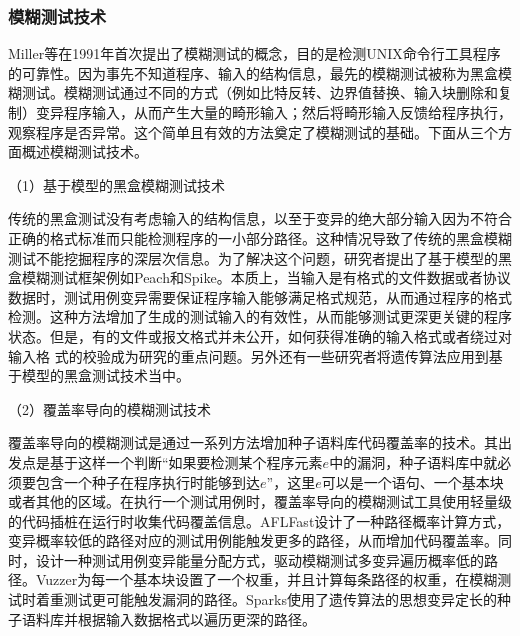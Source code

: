 \subsubsection{模糊测试技术}

Miller等在1991年首次提出了模糊测试的概念，目的是检测UNIX命令行工具程序的可靠性。因为事先不知道程序、输入的结构信息，最先的模糊测试被称为黑盒模糊测试。模糊测试通过不同的方式（例如比特反转、边界值替换、输入块删除和复制）变异程序输入，从而产生大量的畸形输入；然后将畸形输入反馈给程序执行，观察程序是否异常。这个简单且有效的方法奠定了模糊测试的基础。下面从三个方面概述模糊测试技术。

（1）基于模型的黑盒模糊测试技术

传统的黑盒测试没有考虑输入的结构信息，以至于变异的绝大部分输入因为不符合正确的格式标准而只能检测程序的一小部分路径。这种情况导致了传统的黑盒模糊测试不能挖掘程序的深层次信息。为了解决这个问题，研究者提出了基于模型的黑盒模糊测试框架例如Peach和Spike。本质上，当输入是有格式的文件数据或者协议数据时，测试用例变异需要保证程序输入能够满足格式规范，从而通过程序的格式检测。这种方法增加了生成的测试输入的有效性，从而能够测试更深更关键的程序状态。但是，有的文件或报文格式并未公开，如何获得准确的输入格式或者绕过对输入格
式的校验成为研究的重点问题。另外还有一些研究者将遗传算法应用到基于模型的黑盒测试技术当中。


（2）覆盖率导向的模糊测试技术

覆盖率导向的模糊测试是通过一系列方法增加种子语料库代码覆盖率的技术。其出发点是基于这样一个判断“如果要检测某个程序元素$e$中的漏洞，种子语料库中就必须要包含一个种子在程序执行时能够到达$e$”，这里$e$可以是一个语句、一个基本块或者其他的区域。在执行一个测试用例时，覆盖率导向的模糊测试工具使用轻量级的代码插桩在运行时收集代码覆盖信息。AFLFast设计了一种路径概率计算方式，变异概率较低的路径对应的测试用例能触发更多的路径，从而增加代码覆盖率。同时，设计一种测试用例变异能量分配方式，驱动模糊测试多变异遍历概率低的路径。Vuzzer为每一个基本块设置了一个权重，并且计算每条路径的权重，在模糊测试时着重测试更可能触发漏洞的路径。Sparks使用了遗传算法的思想变异定长的种子语料库并根据输入数据格式以遍历更深的路径。

